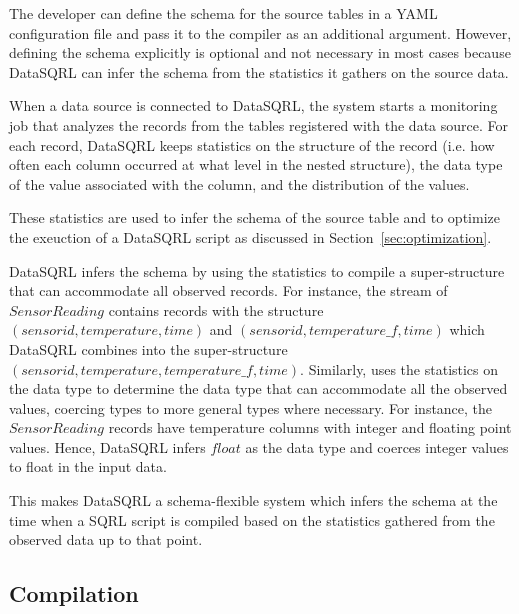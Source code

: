 \documentclass[	DIV=calc,%
							paper=letter,%
							fontsize=11pt,%
							twocolumn]{scrartcl}	 					%
\begin{document}
The developer can define the schema for the source tables in a YAML configuration file and pass it to the compiler as an additional argument. However, defining the schema explicitly is optional and not necessary in most cases because DataSQRL can infer the schema from the statistics it gathers on the source data.

When a data source is connected to DataSQRL, the system starts a monitoring job that analyzes the records from the tables registered with the data source. For each record, DataSQRL keeps statistics on the structure of the record (i.e. how often each column occurred at what level in the nested structure), the data type of the value associated with the column, and the distribution of the values.

These statistics are used to infer the schema of the source table and to optimize the exeuction of a DataSQRL script as discussed in Section~\ref{sec:optimization}.

DataSQRL infers the schema by using the statistics to compile a super-structure that can accommodate all observed records. For instance, the stream of $SensorReading$ contains records with the structure $(sensorid, temperature, time)$ and $(sensorid, temperature\_f, time)$ which DataSQRL combines into the super-structure $(sensorid, temperature, temperature\_f, time)$. Similarly, uses the statistics on the data type to determine the data type that can accommodate all the observed values, coercing types to more general types where necessary. For instance, the $SensorReading$ records have temperature columns with integer and floating point values. Hence, DataSQRL infers $float$ as the data type and coerces integer values to float in the input data.

This makes DataSQRL a schema-flexible system which infers the schema at the time when a SQRL script is compiled based on the statistics gathered from the observed data up to that point.

\subsection{Compilation}
\label{sec:compilation}
\end{document}

